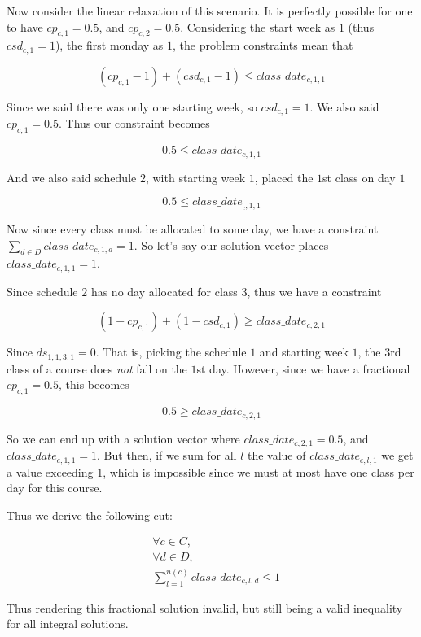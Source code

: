 Now consider the linear relaxation of this scenario. It is perfectly possible for one to have $cp_{c, 1} = 0.5$, and $cp_{c, 2} = 0.5$. Considering the start week as $1$ (thus $csd_{c, 1} = 1$), the first monday as $1$, the problem constraints mean that

$$
(cp_{c, 1} - 1) + (csd_{c, 1} - 1) \le class\_date_{c, 1, 1}
$$

Since we said there was only one starting week, so $csd_{c, 1} = 1$. We also said $cp_{c, 1} = 0.5$. Thus our constraint becomes

$$
0.5 \le class\_date_{c, 1, 1}
$$

And we also said schedule $2$, with starting week $1$,  placed the $1$st class on day $1$

$$
0.5 \le class\_date_{_c, 1, 1}
$$

Now since every class must be allocated to some day, we have a constraint $\sum_{d \in D} class\_date_{c, 1, d} = 1$. So let's say our solution vector places $class\_date_{c, 1, 1} = 1$.

Since schedule $2$ has no day allocated for class $3$, thus we have a constraint

$$
(1 - cp_{c, 1}) + (1 - csd_{c, 1}) \ge class\_date_{c, 2, 1}
$$

Since $ds_{1, 1, 3, 1} = 0$. That is, picking the schedule $1$ and starting week $1$, the $3$rd class of a course does \emph{not} fall on the $1$st day. However, since we have a fractional $cp_{c, 1} = 0.5$, this becomes

$$
0.5 \ge class\_date_{c, 2, 1}
$$

So we can end up with a solution vector where $class\_date_{c, 2, 1} = 0.5$, and $class\_date_{c, 1, 1} = 1$. But then, if we sum for all $l$ the value of $class\_date_{c, l, 1}$ we get a value exceeding $1$, which is impossible since we must at most have one class per day for this course.

Thus we derive the following cut:

\begin{align}
&\forall c \in C,\\
&\forall d \in D,\\
&\sum_{l = 1}^{n(c)} class\_date_{c, l, d} \le 1
\end{align}

Thus rendering this fractional solution invalid, but still being a valid inequality for all integral solutions.
